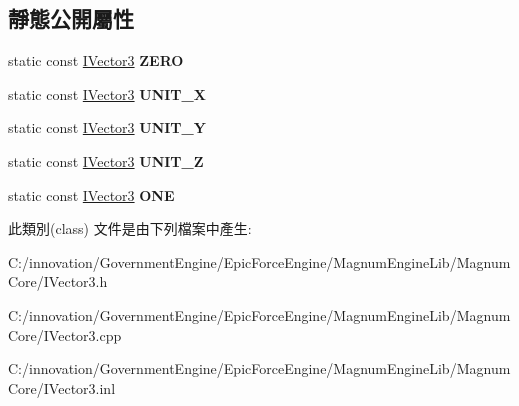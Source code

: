 \subsection*{靜態公開屬性}
\begin{DoxyCompactItemize}
\item 
static const \hyperlink{class_i_dream_sky_1_1_i_vector3}{I\+Vector3} {\bfseries Z\+E\+RO}\hypertarget{class_i_dream_sky_1_1_i_vector3_a2e52690fa6ec027262fc867896718909}{}\label{class_i_dream_sky_1_1_i_vector3_a2e52690fa6ec027262fc867896718909}

\item 
static const \hyperlink{class_i_dream_sky_1_1_i_vector3}{I\+Vector3} {\bfseries U\+N\+I\+T\+\_\+X}\hypertarget{class_i_dream_sky_1_1_i_vector3_a36b184ae6c2e4999d60745b9025ae858}{}\label{class_i_dream_sky_1_1_i_vector3_a36b184ae6c2e4999d60745b9025ae858}

\item 
static const \hyperlink{class_i_dream_sky_1_1_i_vector3}{I\+Vector3} {\bfseries U\+N\+I\+T\+\_\+Y}\hypertarget{class_i_dream_sky_1_1_i_vector3_abe0b939e7f2fc2c5448ae2ed0ba4f9de}{}\label{class_i_dream_sky_1_1_i_vector3_abe0b939e7f2fc2c5448ae2ed0ba4f9de}

\item 
static const \hyperlink{class_i_dream_sky_1_1_i_vector3}{I\+Vector3} {\bfseries U\+N\+I\+T\+\_\+Z}\hypertarget{class_i_dream_sky_1_1_i_vector3_a10687852d1475d88db74b1eea550df00}{}\label{class_i_dream_sky_1_1_i_vector3_a10687852d1475d88db74b1eea550df00}

\item 
static const \hyperlink{class_i_dream_sky_1_1_i_vector3}{I\+Vector3} {\bfseries O\+NE}\hypertarget{class_i_dream_sky_1_1_i_vector3_a2446f9d90308abcb99fe9a81bb805ab3}{}\label{class_i_dream_sky_1_1_i_vector3_a2446f9d90308abcb99fe9a81bb805ab3}

\end{DoxyCompactItemize}


此類別(class) 文件是由下列檔案中產生\+:\begin{DoxyCompactItemize}
\item 
C\+:/innovation/\+Government\+Engine/\+Epic\+Force\+Engine/\+Magnum\+Engine\+Lib/\+Magnum\+Core/I\+Vector3.\+h\item 
C\+:/innovation/\+Government\+Engine/\+Epic\+Force\+Engine/\+Magnum\+Engine\+Lib/\+Magnum\+Core/I\+Vector3.\+cpp\item 
C\+:/innovation/\+Government\+Engine/\+Epic\+Force\+Engine/\+Magnum\+Engine\+Lib/\+Magnum\+Core/I\+Vector3.\+inl\end{DoxyCompactItemize}
